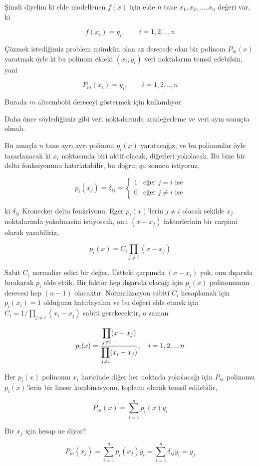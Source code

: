 \documentclass[12pt,fleqn]{article}\usepackage{../../common}
\begin{document}
Şimdi diyelim ki elde modellenen $f(x)$ için elde $n$ tane $x_1,x_2,...,x_n$
değeri var, ki

$$
f(x_i) = y_i, \qquad i=1,2,..,n
$$

Çözmek istediğimiz problem mümkün olan az derecede olan bir polinom $P_m(x)$
yaratmak öyle ki bu polinom eldeki $(x_i,y_i)$ veri noktalarını temsil
edebilsin, yani

$$
P_m(x_i) = y_i, \qquad i=1,2,..,n
$$

Burada $m$ altsembolü dereceyi göstermek için kullanılıyor.

Daha önce söylediğimiz gibi veri noktalarında aradeğerleme ve veri aynı sonuçta
olmalı.

Bu amaçla $n$ tane ayrı ayrı polinom $p_i(x)$ yaratacağız, ve bu polinomlar
öyle tasarlanacak ki $x_i$ noktasında biri aktif olacak, diğerleri yokolacak.
Bu bize bir delta fonksiyonunu hatırlatabilir, bu doğru, şu sonucu istiyoruz,

$$
p_i(x_j) = \delta_{ij} =
\left\{ \begin{array}{ll}
1 & \textrm{eğer } j = i \textrm{ ise} \\
0 & \textrm{eğer } j\ne i \textrm{ ise}
\end{array} \right.
$$

ki $\delta_{ij}$ Kronecker delta fonksiyonu. Eger $p_i(x)$'lerin $j \ne i$
olacak sekilde $x_j$ noktalarinda yokolmasini istiyorsak, onu $(x-x_j)$
faktorlerinin bir carpimi olarak yazabiliriz,

$$
p_i(x) = C_i \prod_{j \ne i} (x-x_j)
$$

Sabit $C_i$ normalize edici bir değer. Üstteki çarpımda $(x-x_i)$ yok,
onu dışarıda bırakarak $p_i$ elde ettik. Bir faktör hep dışarıda olacağı
için $p_i(x)$ polinomunun derecesi hep $(n-1)$ olacaktır. Normalizasyon
sabiti $C_i$ hesaplamak için $p_i(x_i)=1$ olduğunu hatırlayalım ve
bu değeri elde etmek için $C_i = 1 / \prod_{j \ne i} (x_i - x_j)$
sabiti gerekecektir, o zaman

$$
p_i(x) = \frac
{\displaystyle \prod_{j \ne i} (x - x_j)}
{\displaystyle \prod_{j \ne i} (x_i - x_j)},
\quad i=1,2,..,n
$$

Her $p_i(x)$ polinomu $x_i$ haricinde diğer her noktada yokolacağı için $P_m$
polinomu $p_i(x)$'lerin bir lineer kombinasyonu, toplamı olarak temsil
edilebilir,

$$
P_m(x) =  \sum_{i=1}^{n} p_i (x) y_i
$$

Bir $x_j$ için hesap ne diyor?

$$
P_m(x_j) = \sum _{i=1}^{n} p_i(x_j) y_i =  \sum _{i=1}^{n} \delta_{ij} y_i = y_j
$$
\end{document}
